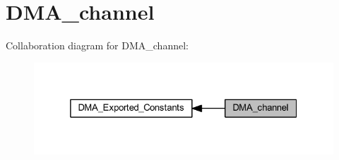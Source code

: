 \hypertarget{group___d_m_a__channel}{}\section{D\+M\+A\+\_\+channel}
\label{group___d_m_a__channel}
Collaboration diagram for D\+M\+A\+\_\+channel\+:\nopagebreak
\begin{figure}[H]
\begin{center}
\leavevmode
\includegraphics[width=325pt]{group___d_m_a__channel}
\end{center}
\end{figure}
